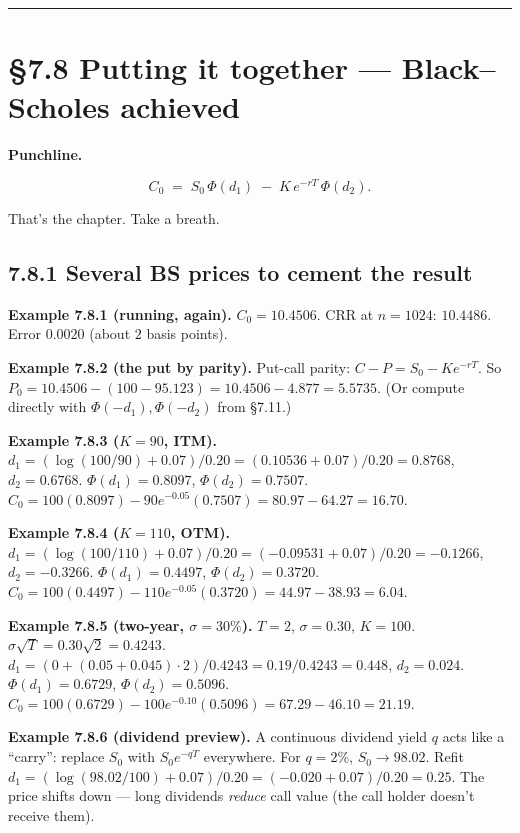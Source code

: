 \documentclass[
  10pt,
  twoside]{book}
\begin{document}
\begin{center}\rule{0.5\linewidth}{0.5pt}\end{center}

\section{§7.8 Putting it together --- Black--Scholes
achieved}\label{putting-it-together-blackscholes-achieved}

\textbf{Punchline.}

\[\boxed{\;\; C_0 \;=\; S_0\,\Phi(d_1) \;-\; K\,e^{-rT}\,\Phi(d_2). \;\;}\]

That's the chapter. Take a breath.

\subsection{7.8.1 Several BS prices to cement the
result}\label{several-bs-prices-to-cement-the-result}

\textbf{Example 7.8.1 (running, again).} \(C_0 = 10.4506\). CRR at
\(n = 1024\): \(10.4486\). Error \(0.0020\) (about \(2\) basis points).

\textbf{Example 7.8.2 (the put by parity).} Put-call parity:
\(C - P = S_0 - Ke^{-rT}\). So
\(P_0 = 10.4506 - (100 - 95.123) = 10.4506 - 4.877 = 5.5735\). (Or
compute directly with \(\Phi(-d_1), \Phi(-d_2)\) from §7.11.)

\textbf{Example 7.8.3 (\(K = 90\), ITM).}
\(d_1 = (\log(100/90) + 0.07)/0.20 = (0.10536 + 0.07)/0.20 = 0.8768\),
\(d_2 = 0.6768\). \(\Phi(d_1) = 0.8097\), \(\Phi(d_2) = 0.7507\).
\(C_0 = 100(0.8097) - 90 e^{-0.05}(0.7507) = 80.97 - 64.27 = 16.70\).

\textbf{Example 7.8.4 (\(K = 110\), OTM).}
\(d_1 = (\log(100/110) + 0.07)/0.20 = (-0.09531 + 0.07)/0.20 = -0.1266\),
\(d_2 = -0.3266\). \(\Phi(d_1) = 0.4497\), \(\Phi(d_2) = 0.3720\).
\(C_0 = 100(0.4497) - 110 e^{-0.05}(0.3720) = 44.97 - 38.93 = 6.04\).

\textbf{Example 7.8.5 (two-year, \(\sigma = 30\%\)).} \(T = 2\),
\(\sigma = 0.30\), \(K = 100\).
\(\sigma\sqrt T = 0.30\sqrt 2 = 0.4243\).
\(d_1 = (0 + (0.05+0.045)\cdot 2)/0.4243 = 0.19/0.4243 = 0.448\),
\(d_2 = 0.024\). \(\Phi(d_1) = 0.6729\), \(\Phi(d_2) = 0.5096\).
\(C_0 = 100(0.6729) - 100 e^{-0.10}(0.5096) = 67.29 - 46.10 = 21.19\).

\textbf{Example 7.8.6 (dividend preview).} A continuous dividend yield
\(q\) acts like a ``carry'': replace \(S_0\) with \(S_0 e^{-qT}\)
everywhere. For \(q = 2\%\), \(S_0 \to 98.02\). Refit
\(d_1 = (\log(98.02/100) + 0.07)/0.20 = (-0.020 + 0.07)/0.20 = 0.25\).
The price shifts down --- long dividends \emph{reduce} call value (the
call holder doesn't receive them).
\end{document}
